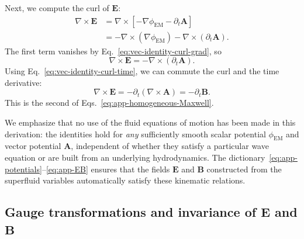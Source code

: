 \documentclass[11pt]{article}
\begin{document}
Next, we compute the curl of $\mathbf{E}$:
\begin{align}
\nabla \times \mathbf{E}
&= \nabla \times \left[-\nabla \phi_{\mathrm{EM}} - \partial_t \mathbf{A}\right]
\nonumber\\
&= -\nabla \times (\nabla \phi_{\mathrm{EM}})
   - \nabla \times (\partial_t \mathbf{A}).
\end{align}
The first term vanishes by Eq.~\eqref{eq:vec-identity-curl-grad}, so
\begin{equation}
\nabla \times \mathbf{E}
= - \nabla \times (\partial_t \mathbf{A}).
\end{equation}
Using Eq.~\eqref{eq:vec-identity-curl-time}, we can commute the curl and the time derivative:
\begin{equation}
\nabla \times \mathbf{E}
= -\partial_t (\nabla \times \mathbf{A})
= -\partial_t \mathbf{B}.
\end{equation}
This is the second of Eqs.~\eqref{eq:app-homogeneous-Maxwell}.

We emphasize that no use of the fluid equations of motion has been made in this derivation: the identities hold for \emph{any} sufficiently smooth scalar potential $\phi_{\mathrm{EM}}$ and vector potential $\mathbf{A}$, independent of whether they satisfy a particular wave equation or are built from an underlying hydrodynamics.  The dictionary~\eqref{eq:app-potentials}--\eqref{eq:app-EB} ensures that the fields $\mathbf{E}$ and $\mathbf{B}$ constructed from the superfluid variables automatically satisfy these kinematic relations.

\subsection{Gauge transformations and invariance of \texorpdfstring{$\mathbf{E}$}{E} and \texorpdfstring{$\mathbf{B}$}{B}}
\end{document}
